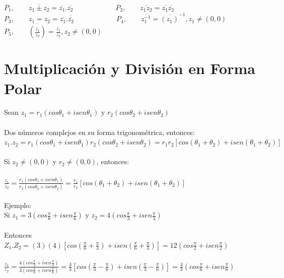 \documentclass[10pt,a4paper]{book}
\begin{document}
$P_{1}, \qquad \overline{z_{1} \pm z_{2}}=\overline{z_{1}}. \overline{z_{2}} \qquad \qquad \qquad P_{2}, \qquad \overline{z_{1}z_{2}}= \overline{z_{1}} \overline{z_{2}}$ \\

$P_{3}, \qquad z_{1} = z_{2}=\overline{z_{1}}. \overline{ \overline{z_{2}}} \qquad \qquad \qquad P_{4}, \qquad \overline{z_{1}^{-1}}= \overline{(z_{1})}^{-1}, z_{1} \neq (0,0)$ \\

$P_{5}, \qquad  \overline{( \frac{z_{1} }{z_{2} } ) } = \frac{ \overline{z_{1} } }{\overline{z_{2} } }, z_{2} \neq (0,0)$\section{Multiplicación y División en Forma Polar}
Sean $z_1 = r_1(cos\theta_1 + isen\theta_1)$  y  $r_2(cos\theta_2+isen\theta_2)$\\
\\
Dos números complejos en su forma trigonométrica, entonces:\\
$z_1.z_2=r_1(cos\theta_1 +isen\theta_1)r_2(cos\theta_2 +isen\theta_2)=r_1r_2[cos(\theta_1+\theta_2)+isen(\theta_1+\theta_2)]$\\
\\
Si $z_2\neq(0,0)$ y $r_2\neq(0,0)$, entonces:\\
\\
$\displaystyle \frac{z_1}{z_2}=\displaystyle \frac{r_1(cos\theta_1 + isen\theta_1)}{r_2(cos\theta_2 +i sen\theta_2)}=\displaystyle \frac{r_1}{r_2}[cos(\theta_1+\theta_2)+isen(\theta_1+\theta_2)]$\\
\\
Ejemplo:\\
Si $z_1=3(cos\displaystyle \frac{\pi}{6}+isen\displaystyle \frac{\pi}{6})$ y $z_2=4(cos\displaystyle \frac{\pi}{3}+isen\displaystyle \frac{\pi}{3})$\\
\\
Entonces $Z_1.Z_2=(3)(4)[cos(\displaystyle \frac{\pi}{6}+\displaystyle \frac{\pi}{3})+isen(\displaystyle \frac{\pi}{6}+\displaystyle \frac{\pi}{3})]=12(cos\displaystyle \frac{\pi}{2}+isen\displaystyle \frac{\pi}{2})$\\
\\
$\displaystyle \frac{z_1}{z_2}=\displaystyle \frac{4(cos\displaystyle \frac{\pi}{3}+isen\displaystyle \frac{\pi}{3})}{3(cos\displaystyle \frac{\pi}{6}+isen\displaystyle \frac{\pi}{6})}=\displaystyle \frac{4}{3}[cos(\displaystyle \frac{\pi}{3}-\displaystyle \frac{\pi}{6})+isen(\displaystyle \frac{\pi}{3}-\displaystyle \frac{\pi}{6})]=\displaystyle \frac{4}{3}(cos\displaystyle \frac{\pi}{6}+isen\displaystyle \frac{\pi}{6})$
\end{document}

